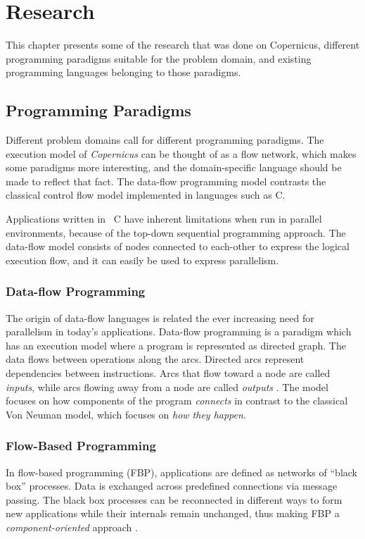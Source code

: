 \chapter{Research}\label{chap:research}
This chapter presents some of the research that was done on
Copernicus, different programming paradigms suitable for the problem
domain, and existing programming languages belonging to those
paradigms.


\section{Programming Paradigms}
Different problem domains call for different programming
paradigms. The execution model of \emph{Copernicus} can be thought of
as a flow network, which makes some paradigms more interesting, and
the domain-specific language should be made to reflect that fact. The
data-flow programming model contrasts the classical control flow model
implemented in languages such as C.

Applications written in \eg~C have inherent limitations when run in
parallel environments, because of the top-down sequential programming
approach. The data-flow model consists of nodes connected to
each-other to express the logical execution flow, and it can easily be
used to express parallelism.


\subsection{Data-flow Programming}
The origin of data-flow languages is related the ever increasing need
for parallelism in today's applications. Data-flow programming is a
paradigm which has an execution model where a program is represented
as directed graph. The data flows between operations along the
arcs. Directed arcs represent dependencies between instructions. Arcs
that flow toward a node are called \emph{inputs}, while arcs flowing
away from a node are called \emph{outputs} \citep{johnston:2004}. The
model focuses on how components of the program \emph{connects} in
contrast to the classical Von Neuman model, which focuses on \emph{how
  they happen}.


\subsection{Flow-Based Programming}
In flow-based programming (FBP), applications are defined as networks
of ``black box'' processes. Data is exchanged across predefined
connections via message passing. The black box processes can be
reconnected in different ways to form new applications while their
internals remain unchanged, thus making FBP a
\emph{component-oriented} approach
\citep{morrison:2010,morrison:online}.


